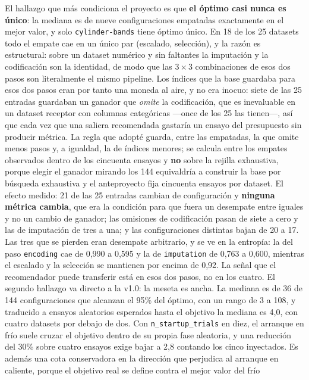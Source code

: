 \documentclass[11pt,letterpaper]{article}
\begin{document}
{El hallazgo que más condiciona el proyecto es que \textbf{el óptimo casi nunca es
 único}: la mediana es de nueve configuraciones empatadas exactamente en el mejor
 valor, y solo \texttt{cylinder-bands} tiene óptimo único. En 18 de los 25 datasets
 todo el empate cae en un único par (escalado, selección), y la razón es estructural:
 sobre un dataset numérico y sin faltantes la imputación y la codificación son la
 identidad, de modo que las $3 \times 3$ combinaciones de esos dos pasos son
 literalmente el mismo pipeline. Los índices que la base guardaba para esos dos pasos
 eran por tanto una moneda al aire, y no era inocuo: siete de las 25 entradas guardaban
 un ganador que \emph{omite} la codificación, que es inevaluable en un dataset receptor
 con columnas categóricas —once de los 25 las tienen—, así que cada vez que una saliera
 recomendada gastaría un ensayo del presupuesto sin producir métrica. La regla que
 adopté guarda, entre las empatadas, la que omite menos pasos y, a igualdad, la de
 índices menores; se calcula entre los empates observados dentro de los cincuenta
 ensayos y \textbf{no} sobre la rejilla exhaustiva, porque elegir el ganador mirando
 los 144 equivaldría a construir la base por búsqueda exhaustiva y el anteproyecto fija
 cincuenta ensayos por dataset. El efecto medido: 21 de las 25 entradas cambian de
 configuración y \textbf{ninguna métrica cambia}, que era la condición para que fuera
 un desempate entre iguales y no un cambio de ganador; las omisiones de codificación
 pasan de siete a cero y las de imputación de tres a una; y las configuraciones
 distintas bajan de 20 a 17. Las tres que se pierden eran desempate arbitrario, y se ve
 en la entropía: la del paso \texttt{encoding} cae de 0,990 a 0,595 y la de
 \texttt{imputation} de 0,763 a 0,600, mientras el escalado y la selección se mantienen
 por encima de 0,92. La señal que el recomendador puede transferir está en esos dos
 pasos, no en los cuatro. El segundo hallazgo va directo a la v1.0: la meseta es ancha.
 La mediana es de 36 de 144 configuraciones que alcanzan el 95\% del óptimo, con un
 rango de 3 a 108, y traducido a ensayos aleatorios esperados hasta el objetivo la
 mediana es 4,0, con cuatro datasets por debajo de dos. Con \texttt{n\_startup\_trials}
 en diez, el arranque en frío suele cruzar el objetivo dentro de su propia fase
 aleatoria, y una reducción del 30\% sobre cuatro ensayos exige bajar a 2,8 contando
 los cinco inyectados. Es además una cota conservadora en la dirección que perjudica al
 arranque en caliente, porque el objetivo real se define contra el mejor valor del frío
}
\end{document}
